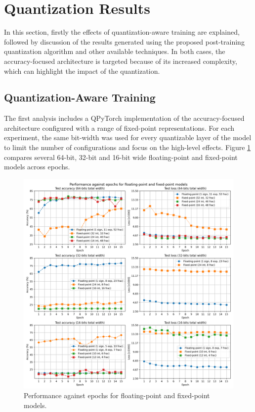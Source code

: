 \section{Quantization Results}
In this section, firstly the effects of quantization-aware training are explained, followed by discussion of the results generated using the proposed post-training quantization algorithm and other available techniques. In both cases, the accuracy-focused architecture is targeted because of its increased complexity, which can highlight the impact of the quantization.

\subsection{Quantization-Aware Training}
The first analysis includes a QPyTorch implementation of the accuracy-focused architecture configured with a range of fixed-point representations. For each experiment, the same bit-width was used for every quantizable layer of the model to limit the number of configurations and focus on the high-level effects. Figure \ref{fig:pre-training} compares several 64-bit, 32-bit and 16-bit wide floating-point and fixed-point models across epochs.

\begin{figure}[hpt!]
  \centering
  \includegraphics[trim={0cm 0cm 0cm 0cm}, clip, width=1.0\textwidth, center]{../logs/training_accuracy.png}
  \caption{Performance against epochs for floating-point and fixed-point models.}
  \label{fig:pre-training}
\end{figure}

